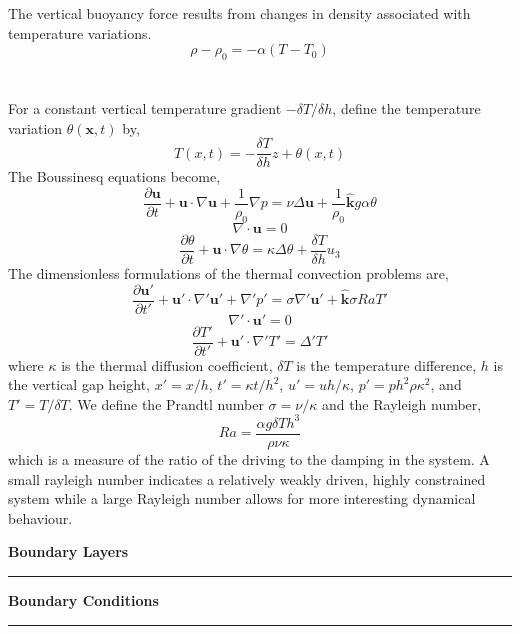 \documentclass[12pt]{article}
\begin{document}
\begin{flushleft}
The vertical buoyancy force results from changes in density associated with temperature variations.
$$\rho-\rho_0 = -\alpha(T-T_0)$$
\\~\\
For a constant vertical temperature gradient $-\delta T/\delta h$, define the temperature variation $\theta(\textbf{x},t)$ by,
$$T(x,t) = -\frac{\delta T}{\delta h}z+\theta(x,t)$$
The Boussinesq equations become,
$$\frac{\partial \textbf{u}}{\partial t}+\textbf{u}\cdot\nabla\textbf{u}+\frac{1}{\rho_0}\nabla p = \nu\Delta\textbf{u}+\frac{1}{\rho_0}\hat{\textbf{k}}g\alpha\theta$$
$$\nabla\cdot\textbf{u} = 0$$
$$\frac{\partial\theta}{\partial t}+\textbf{u}\cdot\nabla\theta = \kappa\Delta\theta + \frac{\delta T}{\delta h}u_3$$
The dimensionless formulations of the thermal convection problems are,
$$\frac{\partial \textbf{u}'}{\partial t'}+\textbf{u}'\cdot\nabla'\textbf{u}'+\nabla'p' = \sigma\nabla'\textbf{u}'+\hat{\textbf{k}}\sigma Ra T'$$
$$\nabla'\cdot\textbf{u}' = 0$$
$$\frac{\partial T'}{\partial t'} + \textbf{u}'\cdot\nabla'T' = \Delta'T'$$
where $\kappa$ is the thermal diffusion coefficient, $\delta T$ is the temperature difference, $h$ is the vertical gap height, $x' = x/h$, $t'=\kappa t/h^2$, $u' = uh/\kappa$, $p'=ph^2\rho\kappa^2$, and $T' = T/\delta T$. We define the Prandtl number $\sigma = \nu/\kappa$ and the Rayleigh number,
$$Ra = \frac{\alpha g\delta T h^3}{\rho \nu \kappa}$$
which is a measure of the ratio of the driving to the damping in the system. A small rayleigh number indicates a relatively weakly driven, highly constrained system while a large Rayleigh number allows for more interesting dynamical behaviour. 
\end{flushleft}

\pagebreak

\begin{huge}
\begin{center}
\textbf{Boundary Layers}
\noindent\rule{16.5cm}{0.4pt}
\end{center}
\end{huge}

\begin{flushleft}

\end{flushleft}

\pagebreak

\begin{huge}
\begin{center}
\textbf{Boundary Conditions}
\noindent\rule{16.5cm}{0.4pt}
\end{center}
\end{huge}
\end{document}
